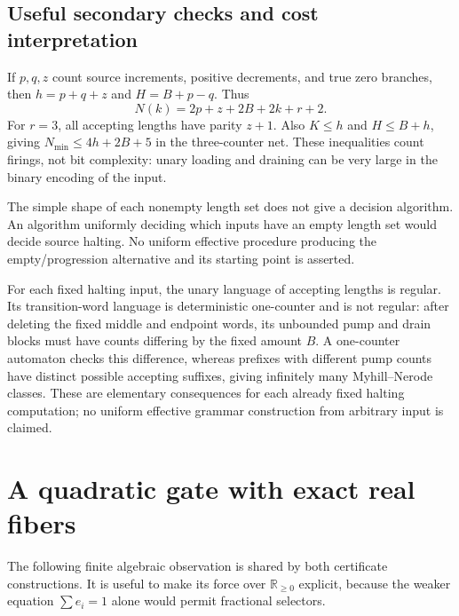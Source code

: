 \documentclass[11pt,letterpaper]{article}
\theoremstyle{definition}
\theoremstyle{remark}
\newcommand{\Rp}{\mathbb R_{\geq0}}
\begin{document}
\subsection{Useful secondary checks and cost interpretation}
If $p,q,z$ count source increments, positive decrements, and true zero branches, then $h=p+q+z$ and $H=B+p-q$. Thus
\[
 N(k)=2p+z+2B+2k+r+2.
\]
For $r=3$, all accepting lengths have parity $z+1$. Also $K\leq h$ and $H\leq B+h$, giving $N_{\min}\leq4h+2B+5$ in the three-counter net. These inequalities count firings, not bit complexity: unary loading and draining can be very large in the binary encoding of the input.

The simple shape of each nonempty length set does not give a decision algorithm. An algorithm uniformly deciding which inputs have an empty length set would decide source halting. No uniform effective procedure producing the empty/progression alternative and its starting point is asserted.

For each fixed halting input, the unary language of accepting lengths is regular. Its transition-word language is deterministic one-counter and is not regular: after deleting the fixed middle and endpoint words, its unbounded pump and drain blocks must have counts differing by the fixed amount $B$. A one-counter automaton checks this difference, whereas prefixes with different pump counts have distinct possible accepting suffixes, giving infinitely many Myhill--Nerode classes. These are elementary consequences for each already fixed halting computation; no uniform effective grammar construction from arbitrary input is claimed.

\section{A quadratic gate with exact real fibers}
\label{qoc:rn:sec:gate}
The following finite algebraic observation is shared by both certificate constructions. It is useful to make its force over $\Rp$ explicit, because the weaker equation $\sum e_i=1$ alone would permit fractional selectors.
\end{document}
